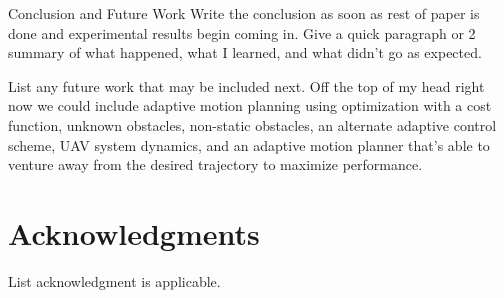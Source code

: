 
\begin{section}{Conclusion and Future Work} \label{sec:conclusion}
Write the conclusion as soon as rest of paper is done and experimental results begin coming in. Give a quick paragraph or 2 summary of what happened, what I learned, and what didn't go as expected.

List any future work that may be included next. Off the top of my head right now we could include adaptive motion planning using optimization with a cost function, unknown obstacles, non-static obstacles, an alternate adaptive control scheme, UAV system dynamics, and an adaptive motion planner that's able to venture away from the desired trajectory to maximize performance.

\end{section}

\section*{Acknowledgments} 
List acknowledgment is applicable.



	
	

